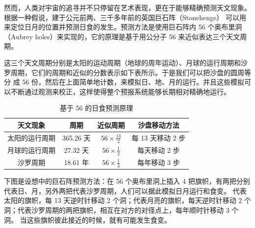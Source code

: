 \documentclass[a4paper,10.5pt]{book}
\begin{document}
然而，人类对宇宙的追寻并不只停留在艺术表现，更在于能够精确预测天文现象。根据一种假说，建于公元前两、三千多年前的英国巨石阵（Stonehenge）
可以用来定位日月的位置并预测日食的发生。预测方法是使用巨石阵内 56 个奥布里洞（Aubrey holes）来实现的，它的原理是基于用公分子 56 来近似表达三个天文周期。

这三个天文周期分别是太阳的运动周期（地球的周年运动）、月球的运行周期和沙罗周期，它们的周期和近似的分数表示如下表所示。于是我们可以把沙盘的圆周等分
成 56 份，然后在上面简单地计数，来模拟日、地、月的运行。并且这些模拟可以不断通过观测来校正，这样使得整个预报系统能够长期相对精确地运行。\cite{beggs2012unifying}

\begin{table}[tbhp]
\centering
\begin{tabular}{|c|c|c|c|}
\hline
天文现象 & 周期 & 近似周期 & 沙盘移动方法 \\
\hline
太阳的运行周期 & 365.26 天 & $ 56 \times \frac{13}{2} $ & 每 13 天移动 2 步 \\
\hline
月球的运行周期 & 27.32 天 & $ 56 \times \frac{1}{2} $  & 每天移动 2 步 \\
\hline
沙罗周期 & 18.61 年 & $ 56 \times \frac{1}{3} $  & 每年移动 3 步 \\
\hline
\end{tabular}
\caption{基于 56 的日食预测原理}
\end{table}

下图是设想中的巨石阵预测方法：在 56 个奥布里洞上插入 4 把旗帜，有两把分别代表日、月，另外两把代表沙罗周期，人们可以据此模拟日月运行和食变。
代表太阳的旗帜，每 13 天逆时针移动 2 个洞；代表月亮的旗帜，每天逆时针移动 2 个洞；代表沙罗周期的两把旗帜，相互在对方的对径点上，每年顺时针移动 3 个洞。
当这些旗帜彼此接近的时候，就有可能发生食变。
\end{document}
